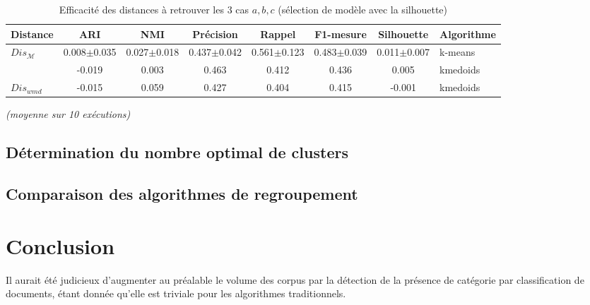 \begin{table}[!htb]
	\scriptsize\centering
	\begin{tabular}{|l||c|c||c|c|c||c||l|}
		\hline
		Distance & ARI & NMI & Précision & Rappel & F1-mesure & Silhouette & Algorithme\\ \hline
		
		
		\multirow{2}{*}{$Dis_\mathcal{M}$} & 0.008$\pm$0.035 & 0.027$\pm$0.018 & 0.437$\pm$0.042 & 0.561$\pm$0.123 & 0.483$\pm$0.039 & 0.011$\pm$0.007 & k-means \\
		& -0.019 & 0.003 & 0.463 & 0.412 & 0.436 & 0.005 & kmedoids \\ \hline
		
		$Dis_{wmd}$   & -0.015 & 0.059 & 0.427 & 0.404 & 0.415 & -0.001 & kmedoids \\ \hline
		
	\end{tabular}
	
	\textit{(moyenne sur 10 exécutions)}
	\caption{Efficacité des distances à retrouver les 3 cas $a,b,c$ (sélection de modèle avec la silhouette)}\label{tab:similarite:compare-dist-1}
\end{table}


\subsection{Détermination du nombre optimal de clusters}


\subsection{Comparaison des algorithmes de regroupement}


\section{Conclusion}
\label{sec:similarite:conclusion}
Il aurait été judicieux d'augmenter au préalable le volume des corpus par la détection de la présence de catégorie par classification de documents, étant donnée qu'elle est triviale pour les algorithmes traditionnels.